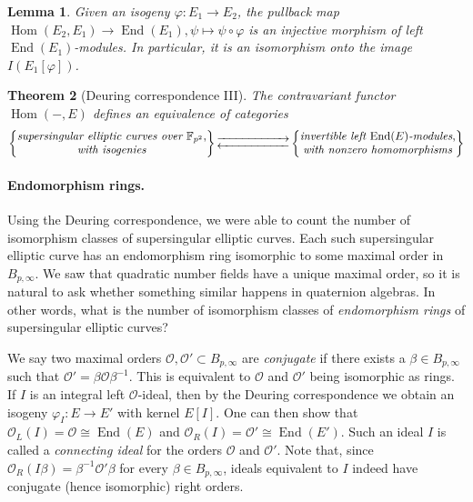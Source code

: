 \documentclass[10pt]{article}
\theoremstyle{plain}
\newtheorem{theorem}{Theorem}
\newtheorem{lemma}[theorem]{Lemma}
\theoremstyle{definition}
\DeclareMathOperator{\End}{End} %
\DeclareMathOperator{\Hom}{Hom} %
\def\F{\ensuremath{\mathbb{F}}}
\def\O{\ensuremath{\mathcal{O}}}
\begin{document}
\begin{lemma}
    Given an isogeny $\varphi:E_1\to E_2$, the pullback map
    $\Hom(E_2,E_1)\to\End(E_1), \psi\mapsto \psi\circ\varphi$
    is an injective morphism of left $\End(E_1)$-modules.
    In particular, it is an isomorphism onto the image $I(E_1[\varphi])$.
\end{lemma}

\begin{theorem}[Deuring correspondence III]
  \label{th:deuring-funct}
    The contravariant functor $\Hom(-,E)$
    defines an equivalence of categories
    \begin{equation*}
        \left\{
            \begin{tabular}{@{} c @{}}
                \emph{supersingular elliptic curves over $\F_{p^2}$}, \\
                \emph{with isogenies}
            \end{tabular}
        \right\}
        \begin{gathered}
            \overset{}{\xrightarrow{\hspace*{2cm}}} \\[-2ex]
            \underset{}{\xleftarrow{\hspace*{2cm}}}
        \end{gathered}
        \left\{
            \begin{tabular}{@{} c @{}}
                \emph{invertible left $\End(E)$-modules}, \\
                \emph{with nonzero homomorphisms}
            \end{tabular}
        \right\}
    \end{equation*}
\end{theorem}

\paragraph{Endomorphism rings.}
Using the Deuring correspondence, we were able to count the number of
isomorphism classes of supersingular elliptic curves.  %
Each such supersingular elliptic curve has an endomorphism ring
isomorphic to some maximal order in $B_{p,\infty}$. %
We saw that quadratic number fields have a unique maximal order, so it
is natural to ask whether something similar happens in quaternion
algebras. %
In other words, what is the number of isomorphism classes of
\emph{endomorphism rings} of supersingular elliptic curves?

We say two maximal orders $\O,\O'\subset B_{p,\infty}$
are \emph{conjugate} if there exists a $\beta\in B_{p,\infty}$ such
that $\O' = \beta\O\beta^{-1}$. This is equivalent to $\O$ and $\O'$
being isomorphic as rings.
If $I$ is an integral left $\O$-ideal, then by the Deuring
correspondence we obtain an isogeny $\varphi_I : E\to E'$
with kernel $E[I]$.
One can then show that $\O_L(I)=\O\cong\End(E)$
and $\O_R(I)=\O'\cong\End(E')$.
Such an ideal $I$ is called a \emph{connecting ideal}
for the orders $\O$ and $\O'$. 
Note that, since $\O_R(I\beta)=\beta^{-1}\O'\beta$ for every
$\beta\in B_{p,\infty}$, ideals equivalent to $I$ indeed
have conjugate (hence isomorphic) right orders. %
\end{document}
